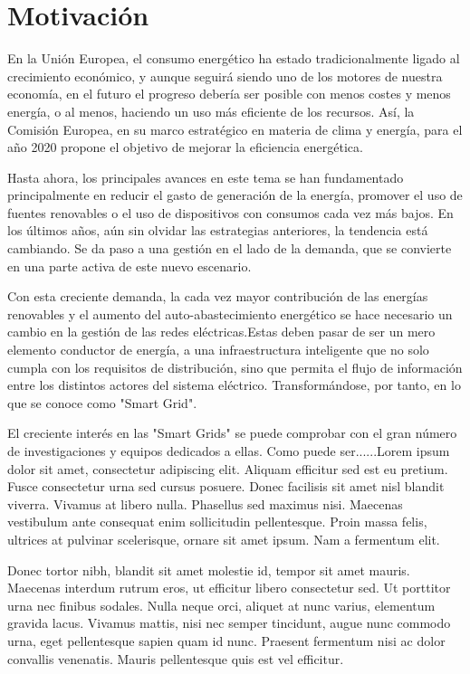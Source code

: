 \chapter{Motivación}
 En la Unión Europea, el consumo energético ha estado tradicionalmente ligado al crecimiento económico, y aunque seguirá siendo uno de los motores de nuestra economía, en el futuro el progreso debería ser posible con menos costes y menos energía, o al menos, haciendo un uso más eficiente de los recursos. Así, la Comisión Europea, en su marco estratégico en materia de clima y energía, para el año 2020 propone el objetivo de mejorar la eficiencia energética.
 
 Hasta ahora, los principales avances en este tema se han fundamentado principalmente en reducir el gasto de generación de la energía, promover el uso de fuentes renovables o el uso de dispositivos con consumos cada vez más bajos. En los últimos años, aún sin olvidar las estrategias anteriores, la tendencia está cambiando. Se da paso a una gestión en el lado de la demanda, que se convierte en una parte activa de este nuevo escenario. 
 
 Con esta creciente demanda, la cada vez mayor contribución de las energías renovables y el aumento del auto-abastecimiento energético se hace necesario un cambio en la gestión de las redes eléctricas.Estas deben pasar de ser un mero elemento conductor de energía, a una infraestructura inteligente que no solo cumpla con los requisitos de distribución, sino que permita el flujo de información entre los distintos actores del sistema eléctrico. Transformándose, por tanto, en lo que se conoce como "Smart Grid".
 
 El creciente interés en las "Smart Grids" se puede comprobar con el gran número de investigaciones y equipos dedicados a ellas. Como puede ser......Lorem ipsum dolor sit amet, consectetur adipiscing elit. Aliquam efficitur sed est eu pretium. Fusce consectetur urna sed cursus posuere. Donec facilisis sit amet nisl blandit viverra. Vivamus at libero nulla. Phasellus sed maximus nisi. Maecenas vestibulum ante consequat enim sollicitudin pellentesque. Proin massa felis, ultrices at pulvinar scelerisque, ornare sit amet ipsum. Nam a fermentum elit.
 
 Donec tortor nibh, blandit sit amet molestie id, tempor sit amet mauris. Maecenas interdum rutrum eros, ut efficitur libero consectetur sed. Ut porttitor urna nec finibus sodales. Nulla neque orci, aliquet at nunc varius, elementum gravida lacus. Vivamus mattis, nisi nec semper tincidunt, augue nunc commodo urna, eget pellentesque sapien quam id nunc. Praesent fermentum nisi ac dolor convallis venenatis. Mauris pellentesque quis est vel efficitur.
 
